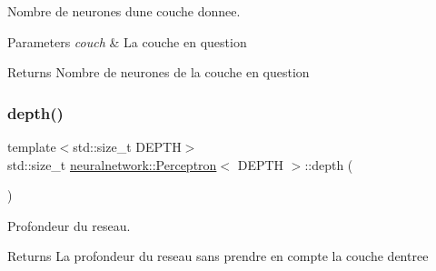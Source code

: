 Nombre de neurones d\textquotesingle{}une couche donnee. 


\begin{DoxyParams}{Parameters}
{\em couch} & La couche en question \\
\hline
\end{DoxyParams}
\begin{DoxyReturn}{Returns}
Nombre de neurones de la couche en question 
\end{DoxyReturn}
\mbox{\label{classneuralnetwork_1_1_perceptron_a967eda62d33f3ac45cff0e6be3e6630a}} 
\subsubsection{\texorpdfstring{depth()}{depth()}}
{\footnotesize\ttfamily template$<$std\+::size\+\_\+t D\+E\+P\+TH$>$ \\
std\+::size\+\_\+t \mbox{\hyperlink{classneuralnetwork_1_1_perceptron}{neuralnetwork\+::\+Perceptron}}$<$ D\+E\+P\+TH $>$\+::depth (\begin{DoxyParamCaption}{ }\end{DoxyParamCaption})}



Profondeur du reseau. 

\begin{DoxyReturn}{Returns}
La profondeur du reseau sans prendre en compte la couche d\textquotesingle{}entree 
\end{DoxyReturn}
\mbox{\label{classneuralnetwork_1_1_perceptron_a83e9fbb5f68a8281fe29c51cc538e44c}} 
